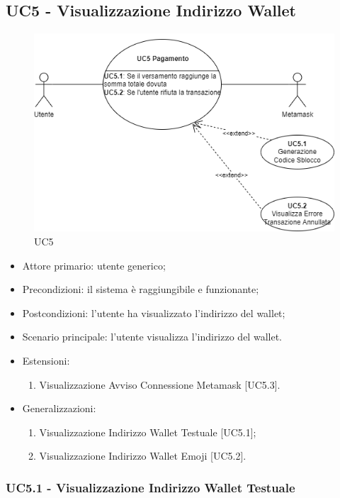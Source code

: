 \subsection{UC5 - Visualizzazione Indirizzo Wallet}

\begin{figure}[H]
    \centering
    \includegraphics[scale=0.7]{immagini/UseCases-UC5.png}
    \caption{UC5}
\end{figure}

\begin{itemize}
    \item Attore primario: utente generico;
    \item Precondizioni: il sistema è raggiungibile e funzionante;
    \item Postcondizioni: l'utente ha visualizzato l'indirizzo del wallet;
    \item Scenario principale: l'utente visualizza l'indirizzo del wallet.
    \item Estensioni:
    \begin{enumerate}
        \item Visualizzazione Avviso Connessione Metamask [UC5.3].
    \end{enumerate}
    \item Generalizzazioni:
    \begin{enumerate}
        \item Visualizzazione Indirizzo Wallet Testuale [UC5.1];
        \item Visualizzazione Indirizzo Wallet Emoji [UC5.2].
    \end{enumerate}
\end{itemize}

\subsubsection{UC5.1 - Visualizzazione Indirizzo Wallet Testuale}

